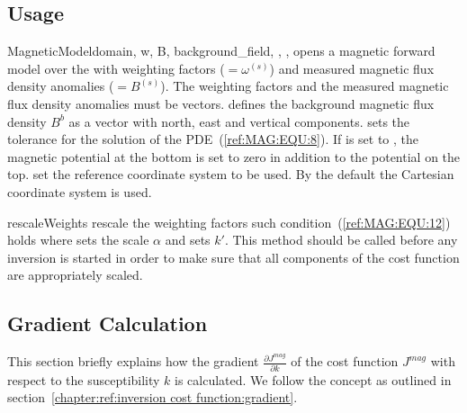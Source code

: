 \subsection{Usage}

\begin{classdesc}{MagneticModel}{domain, w, B, background_field,
        ,
        ,
}
opens a magnetic forward model over the \Domain {} with 
weighting factors  ($=\omega^{(s)}$) and measured magnetic flux
density anomalies  ($=B^{(s)}$).
The weighting factors and the  measured magnetic flux density anomalies must be vectors.
 defines the background magnetic flux density $B^b$
as a vector with north, east and vertical components. 
 sets the tolerance for the solution of the PDE~(\ref{ref:MAG:EQU:8}).
If  is set to  \True, the magnetic potential 
at the bottom is set to zero in addition to the potential on the top. 
 set the reference coordinate system to be used. By the default the 
Cartesian coordinate system is used.
\end{classdesc}

\begin{methoddesc}[MagneticModel]{rescaleWeights}{
 }
rescale the weighting factors such condition~(\ref{ref:MAG:EQU:12}) holds where 
 sets the scale $\alpha$
and  sets $k'$. This method should be called before any inversion is started
in order to make sure that all components of the cost function are appropriately scaled.
\end{methoddesc}


\subsection{Gradient Calculation}
This section briefly explains how the gradient
$\frac{\partial J^{mag}}{\partial k}$ of the cost function $J^{mag}$ with
respect to the susceptibility $k$ is calculated.  We follow the concept as outlined in section~\ref{chapter:ref:inversion cost function:gradient}.

